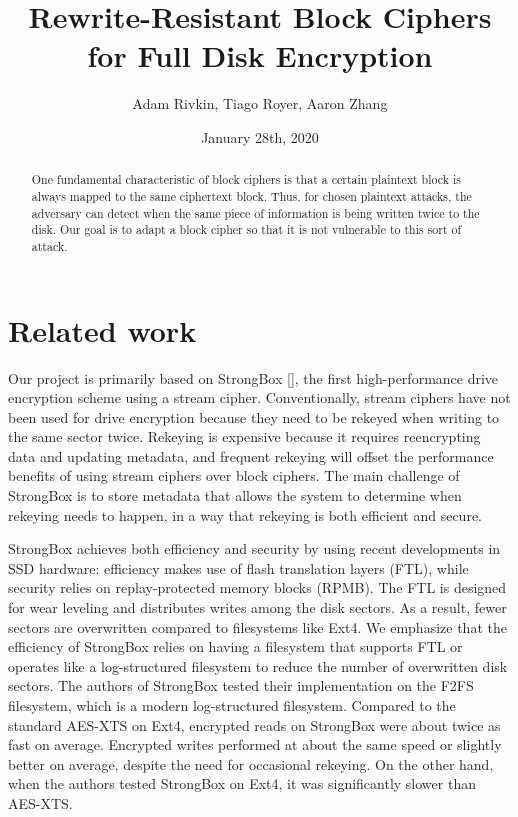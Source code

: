 \documentclass[11pt]{article}
\begin{document}
\title{
    Rewrite-Resistant Block Ciphers for Full Disk Encryption
}
\date{January 28th, 2020}
\author{Adam Rivkin, Tiago Royer, Aaron Zhang}
\maketitle

\begin{abstract}
    One fundamental characteristic of block ciphers
    is that a certain plaintext block is always mapped to the same ciphertext block.
    Thus,
    for chosen plaintext attacks,
    the adversary can detect when the same piece of information
    is being written twice to the disk.
    Our goal is to adapt a block cipher
    so that it is not vulnerable to this sort of attack.
\end{abstract}

\section*{Related work}

Our project is primarily based on StrongBox [], the first high-performance drive encryption scheme using a stream cipher.  Conventionally, stream ciphers have not been used for drive encryption because they need to be rekeyed when writing to the same sector twice.  Rekeying is expensive because it requires reencrypting data and updating metadata, and frequent rekeying will offset the performance benefits of using stream ciphers over block ciphers.  The main challenge of StrongBox is to store metadata that allows the system to determine when rekeying needs to happen, in a way that rekeying is both efficient and secure.

StrongBox achieves both efficiency and security by using recent developments in SSD hardware: efficiency makes use of flash translation layers (FTL), while security relies on replay-protected memory blocks (RPMB).  The FTL is designed for wear leveling and distributes writes among the disk sectors.  As a result, fewer sectors are overwritten compared to filesystems like Ext4.  We emphasize that the efficiency of StrongBox relies on having a filesystem that supports FTL or operates like a log-structured filesystem to reduce the number of overwritten disk sectors.  The authors of StrongBox tested their implementation on the F2FS filesystem, which is a modern log-structured filesystem.  Compared to the standard AES-XTS on Ext4, encrypted reads on StrongBox were about twice as fast on average.  Encrypted writes performed at about the same speed or slightly better on average, despite the need for occasional rekeying.  On the other hand, when the authors tested StrongBox on Ext4, it was significantly slower than AES-XTS.
\end{document}
